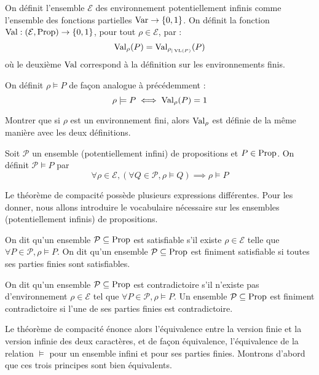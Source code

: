 \begin{definition}
  On définit l'ensemble $\mathcal E$ des environnement potentiellement infinis
  comme l'ensemble des fonctions partielles $\operatorname{Var} \to \{0,1\}$. On définit la
  fonction $\operatorname{Val} : (\mathcal E,\operatorname{Prop})\to \{0,1\}$, pour tout
  $\rho\in\mathcal E$, par :
  \[\operatorname{Val}_\rho(P) = \operatorname{Val}_{\rho_{|\operatorname{VL}(P)}}(P)\]
  où le deuxième $\operatorname{Val}$ correspond à la définition sur les environnements finis.

  On définit $\rho\models P$ de façon analogue à précédemment :
  \[\rho\models P \iff \operatorname{Val}_\rho(P) = 1\]
\end{definition}

\begin{exercise}
  Montrer que si $\rho$ est un environnement fini, alors $\operatorname{Val}_\rho$ est définie
  de la même manière avec les deux définitions.
\end{exercise}

\begin{definition}
  Soit $\mathcal P$ un ensemble (potentiellement infini) de propositions et
  $P\in\operatorname{Prop}$. On définit $\mathcal P\vDash P$ par
  \[\forall \rho\in\mathcal E, (\forall Q \in\mathcal P, \rho\models Q)
  \implies \rho\models P\]
\end{definition}

Le théorème de compacité possède plusieurs expressions différentes. Pour les
donner, nous allons introduire le vocabulaire nécessaire sur les ensembles
(potentiellement infinis) de propositions.

\begin{definition}[Satisfiabilité]
  On dit qu'un ensemble $\mathcal P\subseteq\operatorname{Prop}$ est satisfiable s'il existe
  $\rho\in\mathcal E$ telle que $\forall P\in\mathcal P, \rho\models P$. On dit
  qu'un ensemble $\mathcal P\subseteq\operatorname{Prop}$ est finiment satisfiable si toutes
  ses parties finies sont satisfiables.
\end{definition}

\begin{definition}[Contradiction]
  On dit qu'un ensemble $\mathcal P\subseteq\operatorname{Prop}$ est contradictoire s'il
  n'existe pas d'environnement $\rho\in\mathcal E$ tel que
  $\forall P \in\mathcal P, \rho\models P$. Un ensemble
  $\mathcal P\subseteq \operatorname{Prop}$ est finiment contradictoire si l'une de ses
  parties finies est contradictoire.
\end{definition}

Le théorème de compacité énonce alors l'équivalence entre la version finie et la
version infinie des deux caractères, et de façon équivalence, l'équivalence de
la relation $\vDash$ pour un ensemble infini et pour ses parties finies.
Montrons d'abord que ces trois principes sont bien équivalents.

